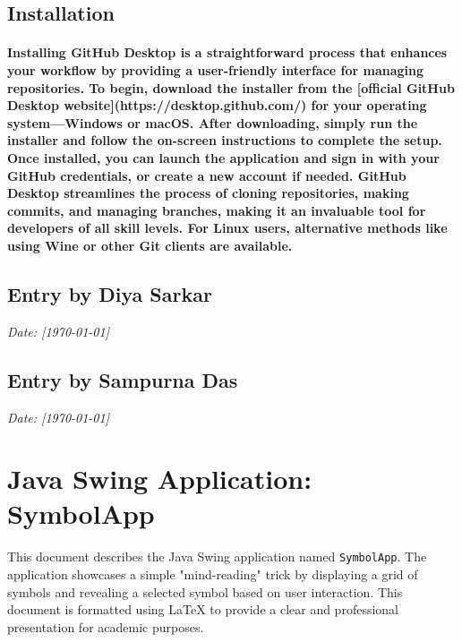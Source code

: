 \documentclass[12pt, a4paper]{article}
\begin{document}
\subsection*{Installation}
\paragraph{Installing GitHub Desktop is a straightforward process that enhances your workflow by providing a user-friendly interface for managing repositories. To begin, download the installer from the [official GitHub Desktop website](https://desktop.github.com/) for your operating system—Windows or macOS. After downloading, simply run the installer and follow the on-screen instructions to complete the setup. Once installed, you can launch the application and sign in with your GitHub credentials, or create a new account if needed. GitHub Desktop streamlines the process of cloning repositories, making commits, and managing branches, making it an invaluable tool for developers of all skill levels. For Linux users, alternative methods like using Wine or other Git clients are available.}


\newpage
{}
\vspace{-2cm}
\subsection*{Entry by Diya Sarkar}
\textit{Date: [\today]}\\

\newpage
{}
\vspace{-2cm}
\subsection*{Entry by Sampurna Das}
\textit{Date: [\today]}\\
\section*{Java Swing Application: SymbolApp}
This document describes the Java Swing application named \texttt{SymbolApp}. The application showcases a simple "mind-reading" trick by displaying a grid of symbols and revealing a selected symbol based on user interaction. This document is formatted using LaTeX to provide a clear and professional presentation for academic purposes.
\end{document}
